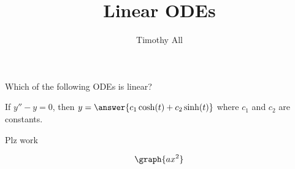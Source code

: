 \documentclass{ximera}%
\title{Linear ODEs}
\author{Timothy All}
\begin{document}
\maketitle



\begin{problem} Which of the following ODEs is linear?
\begin{multipleChoice}
\end{multipleChoice}
\end{problem}

\begin{problem}
   If $y'' - y = 0$, then $y = \answer{c_1 \cosh(t) + c_2 \sinh(t)}$ where $c_1$ and $c_2$ are constants.
\end{problem}









Plz work

\[ \graph{ax^2} \]
\end{document}
